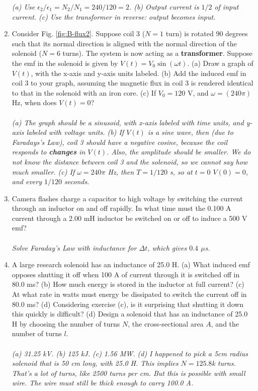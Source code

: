 \documentclass[12pt,twocolumn]{article}
\begin{document}
\begin{enumerate}
\textit{(a) Use $\epsilon_2/\epsilon_1 = N_2/N_1 = 240/120 = 2$. (b) Output current is $1/2$ of input current. (c) Use the transformer in reverse: output becomes input.}
\item Consider Fig. \ref{fig:B-flux2}.  Suppose coil 3 ($N=1$ turn) is rotated 90 degrees such that its normal direction is aligned with the normal direction of the solenoid ($N=6$ turns).  The system is now acting as a \textbf{transformer}.  Suppose the emf in the solenoid is given by $V(t) = V_0 \sin(\omega t)$. (a) Draw a graph of $V(t)$, with the x-axis and y-axis units labeled.  (b) Add the induced emf in coil 3 to your graph, assuming the magnetic flux in coil 3 is rendered identical to that in the solenoid with an iron core.  (c) If $V_0 = 120$ V, and $\omega = (240\pi)$ Hz, when does $V(t) = 0$? \\ \\
\textit{(a) The graph should be a sinusoid, with x-axis labeled with time units, and y-axis labeled with voltage units. (b) If $V(t)$ is a sine wave, then (due to Faradays's Law), coil 3 should have a negative cosine, because the coil responds to \textbf{changes} in $V(t)$.  Also, the amplitude should be smaller.  We do not know the distance between coil 3 and the solenoid, so we cannot say how much smaller. (c) If $\omega = 240\pi$ Hz, then $T = 1/120$ s, so at $t=0$ $V(0) = 0$, and every $1/120$ seconds.}
\item Camera flashes charge a capacitor to high voltage by switching the current through an inductor on and off rapidly. In what time must the 0.100 A current through a 2.00 mH inductor be switched on or off to induce a 500 V emf? \\ \\
\textit{Solve Faraday's Law with inductance for $\Delta t$, which gives $0.4$ $\mu$s.}
\item A large research solenoid has an inductance of 25.0 H. (a) What induced emf opposes shutting it off when 100 A of current through it is switched off in 80.0 ms? (b) How much energy is stored in the inductor at full current? (c) At what rate in watts must energy be dissipated to switch the current off in 80.0 ms? (d) Considering exercise (c), is it surprising that shutting it down this quickly is difficult? (d) Design a solenoid that has an inductance of 25.0 H by choosing the number of turns $N$, the cross-sectional area $A$, and the number of turns $l$. \\ \\
\textit{(a) 31.25 kV. (b) 125 kJ. (c) 1.56 MW. (d) I happened to pick a 5cm radius solenoid that is 50 cm long, with 25.0 H.  This implies $N = 125.8$k turns.  That's a lot of turns, like 2500 turns per cm.  But this is possible with small wire.  The wire must still be thick enough to carry 100.0 A.}

\end{enumerate}
\end{document}
